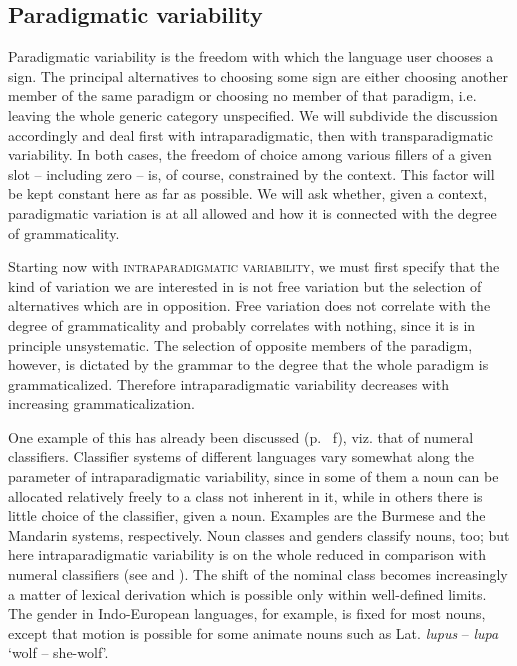 \subsection{Paradigmatic variability} \label{sec:4.2.3}

Paradigmatic variability is the freedom with which the language user chooses a sign. The principal alternatives to choosing some sign are either choosing another member of the same paradigm or choosing no member of that paradigm, i.e. leaving the whole generic category unspecified. We will subdivide the discussion accordingly and deal first with intraparadigmatic, then with transparadigmatic variability. In both cases, the freedom of choice among various fillers of a given slot -- including zero -- is, of course, constrained by the context. This factor will be kept constant here as far as possible. We will ask whether, given a context, paradigmatic variation is at all allowed and how it is connected with the degree of grammaticality.

Starting now with \textsc{intraparadigmatic variability}, we must first specify that the kind of variation we are interested in is not free variation but the selection of alternatives which are in opposition. Free variation does not correlate with the degree of grammaticality and probably correlates with nothing, since it is in principle unsystematic. The selection of opposite members of the paradigm, however, is dictated by the grammar to the degree that the whole paradigm is grammaticalized. Therefore intraparadigmatic variability decreases with increasing grammaticalization.

One example of this has already been discussed (p.~\pageref{page65}\chk%
f), viz. that of numeral classifiers. Classifier systems of different languages vary somewhat along the parameter of intraparadigmatic variability, since in some of them a noun can be allocated relatively freely to a class not inherent in it, while in others there is little choice of the classifier, given a noun. Examples are the Burmese and the Mandarin systems, respectively. Noun classes and genders classify nouns, too; but here intraparadigmatic variability is on the whole reduced in comparison with numeral classifiers (see \citealt{Serzisko1981} and \citealt[§6.3]{Lehmann1982b}). The shift of the nominal class becomes increasingly a matter of lexical derivation which is possible only within well-defined limits. The gender in Indo-European languages, for example, is fixed for most nouns, except that motion is possible for some animate nouns such as Lat. \textit{lupus} -- \textit{lupa} ‘wolf -- she-wolf’.

